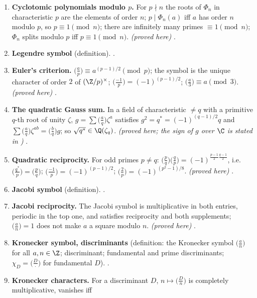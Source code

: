 \begin{enumerate}[label=\textbf{\thechapter.\arabic*}]
$\Phi_n=\prod_{d\mid n}(x^d-1)^{\mu(n/d)}$; formulas for $\Phi_{p^k}$, $\Phi_{2m}$, $\Phi_n(1)$, $\Phi_n(0)$; $\Phi_{p^k}$ is irreducible over $\Q$.
\emph{(proved here)} .
\item \textbf{Cyclotomic polynomials modulo $p$.} For $p\nmid n$ the roots of $\Phi_n$ in characteristic $p$ are the elements of order $n$;
$p\mid\Phi_n(a)$ iff $a$ has order $n$ modulo $p$, so $p\equiv1\pmod n$; there are infinitely many primes $\equiv1\pmod n$; $\Phi_n$
splits modulo $p$ iff $p\equiv1\pmod n$. \emph{(proved here)} .
\item \textbf{Legendre symbol} (definition). .
\item \textbf{Euler's criterion.} $\bigl(\frac ap\bigr)\equiv a^{(p-1)/2}\pmod p$; the symbol is the unique character of order $2$ of $(\Z/p)^\times$;
$\bigl(\frac{-1}p\bigr)=(-1)^{(p-1)/2}$; $\bigl(\frac a3\bigr)\equiv a\pmod3$. \emph{(proved here)} .
\item \textbf{The quadratic Gauss sum.} In a field of characteristic $\ne q$ with a primitive $q$-th root of unity $\zeta$,
$g=\sum\bigl(\frac aq\bigr)\zeta^a$ satisfies $g^2=q^*=(-1)^{(q-1)/2}q$ and $\sum\bigl(\frac aq\bigr)\zeta^{ab}=\bigl(\frac bq\bigr)g$; so $\sqrt{q^*}\in\Q(\zeta_q)$.
\emph{(proved here; the sign of $g$ over $\C$ is stated in )} .
\item \textbf{Quadratic reciprocity.} For odd primes $p\ne q$: $\bigl(\frac pq\bigr)\bigl(\frac qp\bigr)=(-1)^{\frac{p-1}2\frac{q-1}2}$, i.e.
$\bigl(\frac{q^*}p\bigr)=\bigl(\frac pq\bigr)$; $\bigl(\frac{-1}p\bigr)=(-1)^{(p-1)/2}$; $\bigl(\frac2p\bigr)=(-1)^{(p^2-1)/8}$. \emph{(proved here)} .
\item \textbf{Jacobi symbol} (definition). .
\item \textbf{Jacobi reciprocity.} The Jacobi symbol is multiplicative in both entries, periodic in the top one, and satisfies
reciprocity and both supplements; $\bigl(\frac an\bigr)=1$ does not make $a$ a square modulo $n$. \emph{(proved here)} .
\item \textbf{Kronecker symbol, discriminants} (definition: the Kronecker symbol $\bigl(\frac an\bigr)$ for all $a,n\in\Z$; discriminant;
fundamental and prime discriminants; $\chi_D=\bigl(\frac D\cdot\bigr)$ for fundamental $D$). .
\item \textbf{Kronecker characters.} For a discriminant $D$, $n\mapsto\bigl(\frac Dn\bigr)$ is completely multiplicative, vanishes iff

\end{enumerate}
